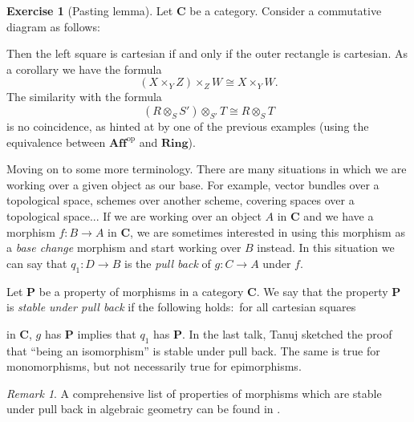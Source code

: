 \documentclass[12pt,a4paper]{amsart}
\theoremstyle{plain}
\theoremstyle{definition}
\newtheorem{xca}[thm]{Exercise}
\theoremstyle{remark}
\newtheorem{rem}[thm]{Remark}
\begin{document}
\begin{xca}[Pasting lemma]
  Let $\mathbf{C}$ be a category.
  Consider a commutative diagram as follows:
  \begin{center}
  \end{center}
  Then the left square is cartesian if and only if the outer rectangle is cartesian.
  As a corollary we have the formula
  \[ (X \times_{Y} Z) \times_{Z} W \cong X \times_{Y} W. \]
  The similarity with the formula
  \[ (R \otimes_{S} S') \otimes_{S'} T \cong R \otimes_{S} T \]
  is no coincidence, as hinted at by one of the previous examples (using the equivalence between $\mathbf{Aff}^{\mathrm{op}}$ and $\mathbf{Ring}$).
\end{xca}

Moving on to some more terminology.
There are many situations in which we are working over a given object as our base.
For example, vector bundles over a topological space, schemes over another scheme, covering spaces over a topological space...
If we are working over an object $A$ in $\mathbf{C}$ and we have a morphism $f \colon B \to A$ in $\mathbf{C}$, we are sometimes interested in using this morphism as a \textit{base change} morphism and start working over $B$ instead.
In this situation we can say that $q_{1} \colon D \to B$ is the \textit{pull back} of $g \colon C \to A$ under $f$.

Let $\mathbf{P}$ be a property of morphisms in a category $\mathbf{C}$.
We say that the property $\mathbf{P}$ is \textit{stable under pull back} if the following holds:~for all cartesian squares
\begin{center}
\end{center}
in $\mathbf{C}$, $g$ has $\mathbf{P}$ implies that $q_{1}$ has $\mathbf{P}$.
In the last talk, Tanuj sketched the proof that ``being an isomorphism'' is stable under pull back.
The same is true for monomorphisms, but not necessarily true for epimorphisms.

\begin{rem}
  A comprehensive list of properties of morphisms which are stable under pull back in algebraic geometry can be found in \cite[Appendix C]{gw10}.
\end{rem}
\end{document}
